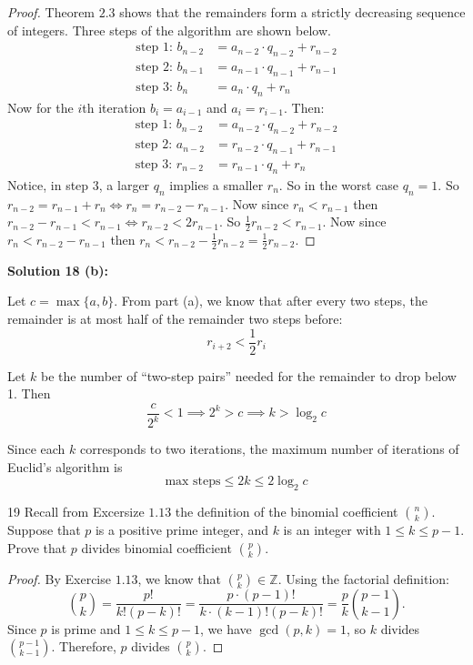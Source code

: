 \begin{proof}
    Theorem $2.3$ shows that the remainders form a strictly decreasing sequence of integers.
    Three steps of the algorithm are shown below.
    \begin{align*}
        \text{step $1$: }b_{n - 2} &= a_{n - 2} \cdot q_{n - 2} + r_{n - 2} \\
        \text{step $2$: }b_{n - 1} &= a_{n - 1} \cdot q_{n - 1} + r_{n - 1} \\
        \text{step $3$: }b_{n} &= a_{n} \cdot q_{n} + r_{n}
    \end{align*}
    Now for the $i$th iteration $b_i = a_{i - 1}$ and $a_i = r_{i - 1}$. Then:
    \begin{align*}
        \text{step $1$: }b_{n - 2} &= a_{n - 2} \cdot q_{n - 2} + r_{n - 2} \\
        \text{step $2$: }a_{n - 2} &= r_{n - 2} \cdot q_{n - 1} + r_{n - 1} \\
        \text{step $3$: }r_{n - 2} &= r_{n - 1} \cdot q_{n} + r_{n}
    \end{align*}
    Notice, in step $3$, a larger $q_n$ implies a smaller $r_n$.
    So in the worst case $q_n = 1$. So $r_{n - 2} = r_{n - 1} + r_{n} \iff r_n = r_{n - 2} - r_{n - 1}$.
    Now since $r_n < r_{n - 1}$ then $r_{n - 2} - r_{n - 1} < r_{n - 1} \iff r_{n - 2} < 2r_{n - 1}$.
    So $\frac{1}{2} r_{n - 2} < r_{n - 1}$. 
    Now since $r_n < r_{n - 2} - r_{n - 1}$ then $r_n < r_{n - 2} - \frac{1}{2} r_{n - 2} = \frac{1}{2} r_{n - 2}$.
\end{proof}

\textbf{Solution 18 (b):}

Let $c = \max\{a, b\}$.
From part (a), we know that after every two steps, the remainder is at most half of the remainder two steps before: 
\[
r_{i+2} < \frac{1}{2} r_i
\]

Let \(k\) be the number of ``two-step pairs'' needed for the remainder to drop below 1. Then
\[
\frac{c}{2^k} < 1 \implies 2^k > c \implies k > \log_2 c
\]

Since each \(k\) corresponds to two iterations, the maximum number of iterations of Euclid's algorithm is
\[
\text{max steps} \le 2k \le 2 \log_2 c
\]

\begin{problem}{19}
    Recall from Excersize $1.13$ the definition of the binomial coefficient 
    $\binom{n}{k}$. Suppose that $p$ is a positive prime integer, and $k$ is 
    an integer with $1 \le k \le p - 1$. Prove that $p$ divides binomial    
    coefficient $\binom{p}{k}$.
\end{problem}
\solved

\begin{proof}
By Exercise $1.13$, we know that $\binom{p}{k} \in \mathbb{Z}$.  
Using the factorial definition:
\[
\binom{p}{k} = \frac{p!}{k!(p-k)!} = \frac{p \cdot (p-1)!}{k \cdot (k-1)! (p-k)!} = \frac{p}{k} \binom{p-1}{k-1}.
\]
Since $p$ is prime and $1 \le k \le p-1$, we have $\gcd(p,k)=1$, 
so $k$ divides $\binom{p-1}{k-1}$. Therefore, $p$ divides $\binom{p}{k}$.
\end{proof}
